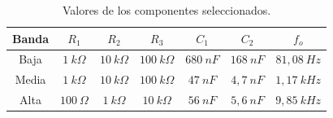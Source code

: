\documentclass[a4paper]{article}
\begin{document}
\begin{table}[H]
\begin{center}
\begin{tabular}{ccccccc}
\hline
Banda & $R_1$ & $R_2$ & $R_3$ & $C_1$ & $C_2$ & $f_o$ \\
\hline
Baja & $1 \ k\Omega$ & $10 \ k\Omega$ & $100 \ k\Omega$ & $680 \ nF$ & $168 \ nF$ & $81,08 \ Hz$ \\
Media & $1 \ k\Omega$ & $10 \ k\Omega$ & $100 \ k\Omega$ & $47 \ nF$ & $4,7 \ nF$ & $1,17 \ kHz$ \\
Alta & $100 \ \Omega$ & $1 \ k\Omega$ & $10 \ k\Omega$ & $56 \ nF$ & $5,6 \ nF$ & $9,85 \ kHz$\\
\hline
\end{tabular}
\caption{Valores de los componentes seleccionados.}
\end{center}
\end{table}
\end{document}
